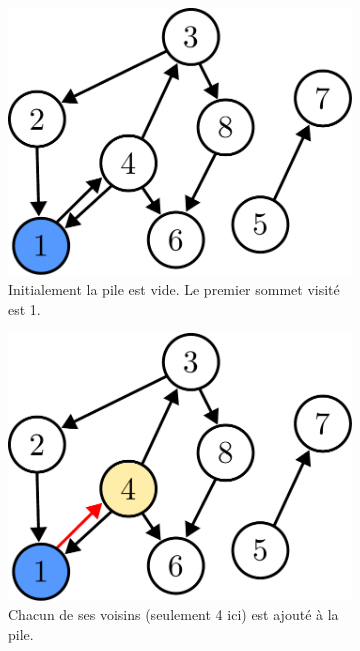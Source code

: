 \documentclass{article}
\begin{document}
\begin{itemize}
	\begin{figure}[b]
		\caption{Illustration d'un parcours en profondeur commençant par le sommet 1}\label{fig:dfs}
		\begin{subfigure}[t]{0.3\linewidth}
			\centering
			\includegraphics[width=0.9\linewidth]{../figures/bfs1.pdf}
			\caption{Initialement la pile est vide. Le premier sommet visité est 1.}
		\end{subfigure}\hfill%
		\begin{subfigure}[t]{0.3\linewidth}
			\centering
			\includegraphics[width=0.9\linewidth]{../figures/bfs2.pdf}
			\caption{Chacun de ses voisins (seulement 4 ici) est ajouté à la pile.}
		\end{subfigure}\hfill%
		\begin{subfigure}[t]{0.3\linewidth}
			\centering

\end{subfigure}
\end{figure}
\end{itemize}
\end{document}
